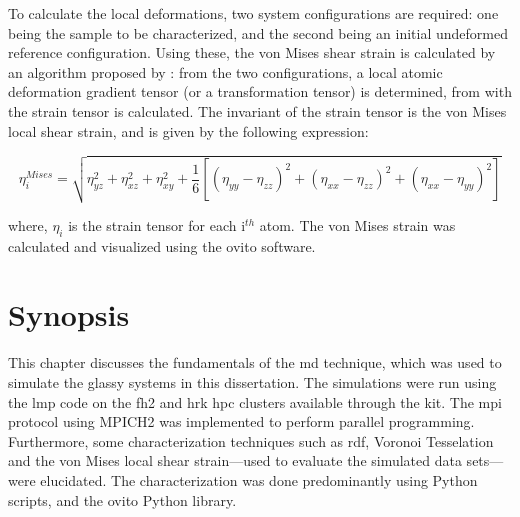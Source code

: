 To calculate the local deformations, two system configurations are required: one being the sample to be characterized, and the second being an initial undeformed reference configuration. Using these, the von Mises shear strain is calculated by an algorithm proposed by \textcite{Shimizu2007}: from the two configurations, a local atomic deformation gradient tensor (or a transformation tensor) is determined, from with the strain tensor is calculated. The invariant of the strain tensor is the von Mises local shear strain, and is given by the following expression:

\begin{equation}
\eta_i ^{Mises} = \sqrt{\eta_{yz}^2 + \eta_{xz}^2 + \eta_{xy}^2 + \frac{1}{6} \left[ \left(\eta_{yy} - \eta_{zz}\right)^2 + \left(\eta_{xx} - \eta_{zz}\right)^2 + \left(\eta_{xx} - \eta_{yy}\right)^2 \right]}
\end{equation}

where, $\eta_i$ is the strain tensor for each i$^{th}$ atom. The von Mises strain was calculated and visualized using the \gls{ovito} software.

%

\clearpage
\section{Synopsis}
This chapter discusses the fundamentals of the \gls{md} technique, which was used to simulate the glassy systems in this dissertation. The simulations were run using the \gls{lmp} code on the \gls{fh2} and \gls{hrk} \gls{hpc} clusters available through the \gls{kit}. The \gls{mpi} protocol using MPICH2 was implemented to perform parallel programming. Furthermore, some characterization techniques such as \gls{rdf}, Voronoi Tesselation and the von Mises local shear strain---used to evaluate the simulated data sets---were elucidated. The characterization was done predominantly using Python scripts, and the \gls{ovito} Python library. \par

